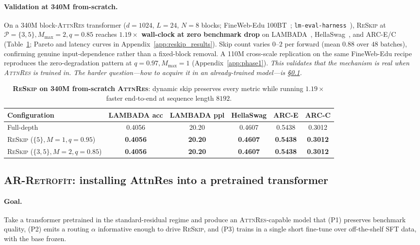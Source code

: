 \documentclass{article}
\newcommand{\attnres}{\textsc{AttnRes}}
\newcommand{\reskip}{\textsc{ReSkip}}
\newcommand{\retrofit}{\textsc{AR-Retrofit}}
\begin{document}
\paragraph{Validation at 340M from-scratch.}
On a 340M block-\attnres{} transformer ($d{=}1024$, $L{=}24$, $N{=}8$ blocks; FineWeb-Edu 100BT~\citep{penedo2024fineweb}; \texttt{lm-eval-harness}~\citep{eval-harness}), \reskip{} at $\mathcal{P}{=}\{3,5\}, M_{\max}{=}2, q{=}0.85$ reaches \textbf{$1.19\times$ wall-clock at zero benchmark drop} on LAMBADA~\citep{paperno2016lambada}, HellaSwag~\citep{zellers2019hellaswag}, and ARC-E/C~\citep{clark2018arc} (Table~\ref{tab:reskip_benchmark}; Pareto and latency curves in Appendix~\ref{app:reskip_results}). Skip count varies $0$--$2$ per forward (mean $0.88$ over $48$ batches), confirming genuine input-dependence rather than a fixed-block removal. A 110M cross-scale replication on the same FineWeb-Edu recipe reproduces the zero-degradation pattern at $q{=}0.97, M_{\max}{=}1$ (Appendix~\ref{app:phase1}). \emph{This validates that the mechanism is real when \attnres{} is trained in. The harder question---how to acquire it in an already-trained model---is \S\ref{sec:retrofit}.}

\begin{table}[t]
\caption{\textbf{\reskip{} on 340M from-scratch \attnres{}}: dynamic skip preserves every metric while running $1.19\times$ faster end-to-end at sequence length $8192$.}
\label{tab:reskip_benchmark}
\centering\small
\begin{tabular}{lccccc}
\toprule
Configuration & LAMBADA acc & LAMBADA ppl & HellaSwag & ARC-E & ARC-C \\
\midrule
Full-depth & 0.4056 & 20.20 & 0.4607 & 0.5438 & 0.3012 \\
\reskip{} ($\{5\}, M{=}1, q{=}0.95$) & \textbf{0.4056} & \textbf{20.20} & \textbf{0.4607} & \textbf{0.5438} & \textbf{0.3012} \\
\reskip{} ($\{3,5\}, M{=}2, q{=}0.85$) & \textbf{0.4056} & \textbf{20.20} & \textbf{0.4607} & \textbf{0.5438} & \textbf{0.3012} \\
\bottomrule
\end{tabular}
\end{table}

\subsection{\retrofit{}: installing AttnRes into a pretrained transformer}
\label{sec:retrofit}

\paragraph{Goal.} Take a transformer pretrained in the standard-residual regime and produce an \attnres{}-capable model that (P1) preserves benchmark quality, (P2) emits a routing $\alpha$ informative enough to drive \reskip{}, and (P3) trains in a single short fine-tune over off-the-shelf SFT data, with the base frozen.
\end{document}
